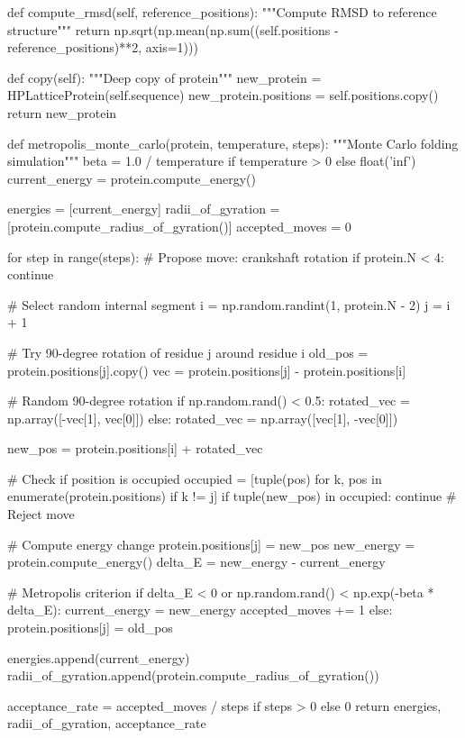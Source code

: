 \documentclass[a4paper, 11pt]{article}
\begin{document}
\begin{pycode}
    def compute_rmsd(self, reference_positions):
        """Compute RMSD to reference structure"""
        return np.sqrt(np.mean(np.sum((self.positions - reference_positions)**2, axis=1)))

    def copy(self):
        """Deep copy of protein"""
        new_protein = HPLatticeProtein(self.sequence)
        new_protein.positions = self.positions.copy()
        return new_protein

def metropolis_monte_carlo(protein, temperature, steps):
    """Monte Carlo folding simulation"""
    beta = 1.0 / temperature if temperature > 0 else float('inf')
    current_energy = protein.compute_energy()

    energies = [current_energy]
    radii_of_gyration = [protein.compute_radius_of_gyration()]
    accepted_moves = 0

    for step in range(steps):
        # Propose move: crankshaft rotation
        if protein.N < 4:
            continue

        # Select random internal segment
        i = np.random.randint(1, protein.N - 2)
        j = i + 1

        # Try 90-degree rotation of residue j around residue i
        old_pos = protein.positions[j].copy()
        vec = protein.positions[j] - protein.positions[i]

        # Random 90-degree rotation
        if np.random.rand() < 0.5:
            rotated_vec = np.array([-vec[1], vec[0]])
        else:
            rotated_vec = np.array([vec[1], -vec[0]])

        new_pos = protein.positions[i] + rotated_vec

        # Check if position is occupied
        occupied = [tuple(pos) for k, pos in enumerate(protein.positions) if k != j]
        if tuple(new_pos) in occupied:
            continue  # Reject move

        # Compute energy change
        protein.positions[j] = new_pos
        new_energy = protein.compute_energy()
        delta_E = new_energy - current_energy

        # Metropolis criterion
        if delta_E < 0 or np.random.rand() < np.exp(-beta * delta_E):
            current_energy = new_energy
            accepted_moves += 1
        else:
            protein.positions[j] = old_pos

        energies.append(current_energy)
        radii_of_gyration.append(protein.compute_radius_of_gyration())

    acceptance_rate = accepted_moves / steps if steps > 0 else 0
    return energies, radii_of_gyration, acceptance_rate


\end{pycode}
\end{document}
